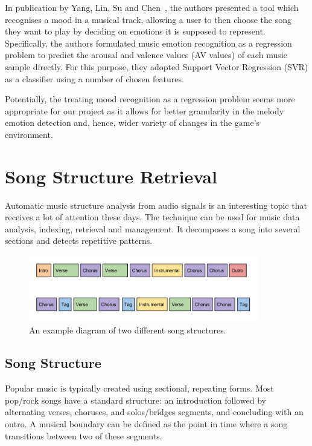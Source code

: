 In publication by Yang, Lin, Su and Chen~\cite{mood}, the authors presented a tool which recognises a mood in a musical track, allowing a user to then choose the song they want to play by deciding on emotions it is supposed to represent. Specifically, the authors formulated music emotion recognition as a regression problem to predict the arousal and valence values (AV values) of each music sample directly. For this purpose, they adopted Support Vector Regression (SVR) as a classifier using a number of chosen features.

Potentially, the treating mood recognition as a regression problem seems more appropriate for our project as it allows for better granularity in the melody emotion detection and, hence, wider variety of changes in the game's environment.

\vspace{20pt}

\section{Song Structure Retrieval}
\vspace{10pt}

Automatic music structure analysis from audio signals is an interesting topic that receives a lot of attention these days. The technique can be used for music data analysis, indexing, retrieval and management. It decomposes a song into several sections and detects repetitive patterns.

\begin{figure}[h]
	\centering
   \includegraphics[width=0.9\textwidth]{Figures/songstructure}
  \caption{An example diagram of two different song structures.}
\end{figure}


\vspace{10pt}

\subsection{Song Structure}



Popular music is typically created using sectional, repeating forms. 
Most pop/rock songs have a standard structure: an introduction followed by alternating verses, choruses, and solos/bridges segments, and concluding with an outro. A musical boundary can be defined as the point in time where a song transitions between two of these segments.

